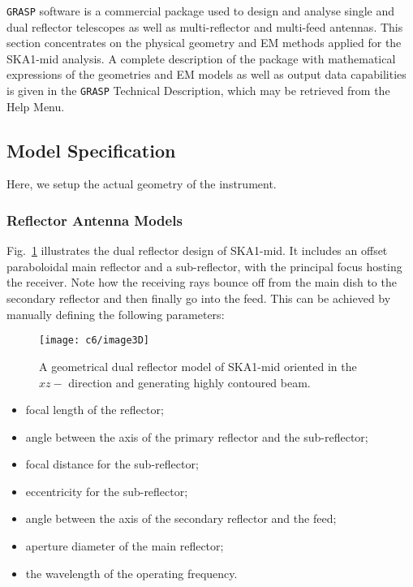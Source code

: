 {\tt GRASP} software is a commercial package used to design and analyse single and dual reflector telescopes as well as multi-reflector and multi-feed antennas. This section concentrates on the physical geometry and EM methods applied for the SKA1-mid analysis. A complete description of the package with mathematical expressions of the geometries and EM models as well as output data capabilities is given in the {\tt GRASP} Technical Description, which may be retrieved from the Help Menu.
\subsection{Model Specification}	  		\label{chap6:mspec}
Here, we setup the actual geometry of the instrument.

\subsubsection{Reflector Antenna Models}		  \label{chap6:rspec}

Fig.~\ref{fig:geo-model} illustrates the dual reflector design of SKA1-mid. It includes an offset paraboloidal main reflector and a sub-reflector, with the principal focus hosting the receiver. Note how the receiving rays bounce off from the main dish to the secondary reflector and then finally go into the feed. This can be achieved by manually defining the following parameters:
\begin{figure}
\begin{minipage}[H]{\linewidth}
\centering
\texttt{[image: c6/image3D]}
\caption{\label{fig:geo-model} A geometrical dual reflector model of SKA1-mid oriented in the $xz-$ direction and generating highly contoured beam.}
   \end{minipage}
\end{figure}
\FloatBarrier

\begin{itemize} %
 \item focal length of the reflector;
\item angle between the axis of the primary reflector and the sub-reflector;
\item focal distance for the sub-reflector;
 \item eccentricity for the sub-reflector;
 \item angle between the axis of the secondary reflector  and the feed;
\item  aperture diameter of the main reflector;
 \item the wavelength of the operating frequency. 
\end{itemize}%

